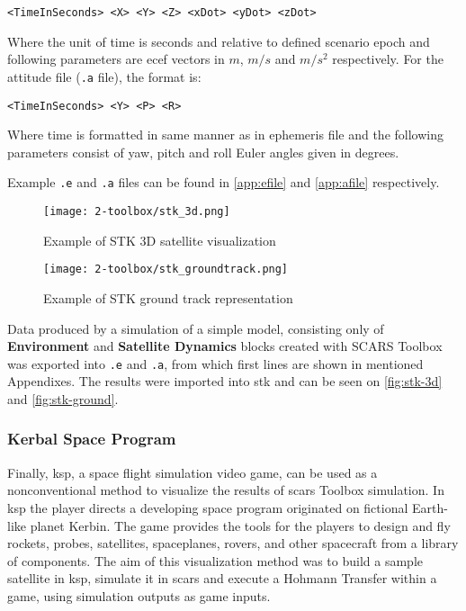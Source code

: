         \begin{Verbatim}[fontsize=\small]
<TimeInSeconds> <X> <Y> <Z> <xDot> <yDot> <zDot>
        \end{Verbatim}

        Where the unit of time is seconds and relative to defined scenario epoch and following parameters are \ac{ecef} vectors in $m$, $m/s$ and $m/s^2$ respectively. For the attitude file (\verb|.a| file), the format is:
        
        \begin{Verbatim}[fontsize=\small]
<TimeInSeconds> <Y> <P> <R>
        \end{Verbatim}
        
        Where time is formatted in same manner as in ephemeris file and the following parameters consist of yaw, pitch and roll Euler angles given in degrees.

        Example \verb|.e| and \verb|.a| files can be found in \autoref{app:efile} and \autoref{app:afile} respectively.


        \begin{figure}[H]
            \centering
            \texttt{[image: 2-toolbox/stk\_3d.png]}
            \caption{Example of STK 3D satellite visualization}
            \label{fig:stk-3d}
        \end{figure}

        \begin{figure}[H]
            \centering
            \texttt{[image: 2-toolbox/stk\_groundtrack.png]}
            \caption{Example of STK ground track representation}
            \label{fig:stk-ground}
        \end{figure}

        Data produced by a simulation of a simple model, consisting only of \textbf{Environment} and \textbf{Satellite Dynamics} blocks created with SCARS Toolbox was exported into  \verb|.e| and \verb|.a|, from which first lines are shown in mentioned Appendixes. The results were imported into \ac{stk} and can be seen on \autoref{fig:stk-3d} and \autoref{fig:stk-ground}.


    \subsubsection{Kerbal Space Program}\label{sec:ksp}
        Finally, \ac{ksp}, a space flight simulation video game, can be used as a nonconventional method to visualize the results of \ac{scars} Toolbox simulation. In \ac{ksp} the player directs a developing space program originated on fictional Earth-like planet Kerbin. The game provides the tools for the players to design and fly rockets, probes, satellites, spaceplanes, rovers, and other spacecraft from a library of components\cite{kerbals}. The aim of this visualization method was to build a sample satellite in \ac{ksp}, simulate it in \ac{scars} and execute a Hohmann Transfer within a game, using simulation outputs as game inputs.

